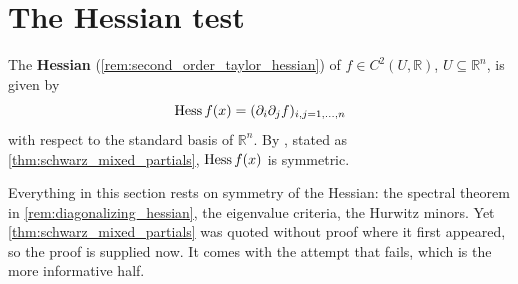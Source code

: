 
\section{The Hessian test}
\label{sec:hessian_test}

The \textbf{Hessian} (\cref{rem:second_order_taylor_hessian}) of $f \in C^2(U,\mathbb{R})$,
$U \subseteq \mathbb{R}^n$, is given by
\[\operatorname{Hess} f(x) = (\partial_i\partial_j f)_{i,j=1,\dots,n}\]
with respect to the standard basis of $\mathbb{R}^n$. By 
, stated as \cref{thm:schwarz_mixed_partials},
$\operatorname{Hess} f(x)$ is symmetric.

\begin{remark}
Everything in this section rests on symmetry of the Hessian: the spectral theorem in
\cref{rem:diagonalizing_hessian}, the eigenvalue criteria, the Hurwitz minors. Yet
\cref{thm:schwarz_mixed_partials} was quoted without proof where it first appeared, so the proof
is supplied now. It comes with the attempt that fails, which is the more informative half.
\end{remark}

